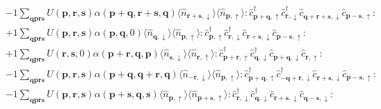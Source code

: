 \begin{align*}
	&-1 \sum_{ \mathbf{q} \mathbf{p} \mathbf{r} \mathbf{s} } U( \mathbf{p}, \mathbf{r}, \mathbf{s} )  \alpha( \mathbf{p}+\mathbf{q}, \mathbf{r}+\mathbf{s}, \mathbf{q} )   \langle \hat{n}_{ \mathbf{r}+\mathbf{s}, \downarrow } \rangle \langle \hat{n}_{ \mathbf{p}, \uparrow } \rangle :\hat{c}_{ \mathbf{p}+\mathbf{q}, \uparrow }^\dagger \hat{c}_{ \mathbf{r}, \downarrow }^\dagger \hat{c}_{ \mathbf{q}+\mathbf{r}+\mathbf{s}, \downarrow }^{\phantom{\dagger}}\hat{c}_{ \mathbf{p}-\mathbf{s}, \uparrow }^{\phantom{\dagger}}: \\
	&+1 \sum_{ \mathbf{q} \mathbf{p} \mathbf{r} \mathbf{s} } U( \mathbf{p}, \mathbf{r}, \mathbf{s} )  \alpha( \mathbf{p}, \mathbf{q}, 0 )   \langle \hat{n}_{ \mathbf{q}, \downarrow } \rangle \langle \hat{n}_{ \mathbf{p}, \uparrow } \rangle :\hat{c}_{ \mathbf{p}, \uparrow }^\dagger \hat{c}_{ \mathbf{r}, \downarrow }^\dagger \hat{c}_{ \mathbf{r}+\mathbf{s}, \downarrow }^{\phantom{\dagger}}\hat{c}_{ \mathbf{p}-\mathbf{s}, \uparrow }^{\phantom{\dagger}}: \\
	&+1 \sum_{ \mathbf{q} \mathbf{p} \mathbf{r} \mathbf{s} } U( \mathbf{r}, \mathbf{s}, 0 )  \alpha( \mathbf{p}+\mathbf{r}, \mathbf{q}, \mathbf{p} )   \langle \hat{n}_{ \mathbf{s}, \downarrow } \rangle \langle \hat{n}_{ \mathbf{r}, \uparrow } \rangle :\hat{c}_{ \mathbf{p}+\mathbf{r}, \uparrow }^\dagger \hat{c}_{ \mathbf{q}, \downarrow }^\dagger \hat{c}_{ \mathbf{p}+\mathbf{q}, \downarrow }^{\phantom{\dagger}}\hat{c}_{ \mathbf{r}, \uparrow }^{\phantom{\dagger}}: \\
	&-1 \sum_{ \mathbf{q} \mathbf{p} \mathbf{r} \mathbf{s} } U( \mathbf{p}, \mathbf{r}, \mathbf{s} )  \alpha( \mathbf{p}+\mathbf{q}, \mathbf{q}+\mathbf{r}, \mathbf{q} )   \langle \hat{n}_{ -\mathbf{r}, \downarrow } \rangle \langle \hat{n}_{ \mathbf{p}, \uparrow } \rangle :\hat{c}_{ \mathbf{p}+\mathbf{q}, \uparrow }^\dagger \hat{c}_{ -\mathbf{q}+\mathbf{r}, \downarrow }^\dagger \hat{c}_{ \mathbf{r}+\mathbf{s}, \downarrow }^{\phantom{\dagger}}\hat{c}_{ \mathbf{p}-\mathbf{s}, \uparrow }^{\phantom{\dagger}}: \\
	&-1 \sum_{ \mathbf{q} \mathbf{p} \mathbf{r} \mathbf{s} } U( \mathbf{p}, \mathbf{r}, \mathbf{s} )  \alpha( \mathbf{p}+\mathbf{s}, \mathbf{q}, \mathbf{s} )   \langle \hat{n}_{ \mathbf{p}, \uparrow } \rangle \langle \hat{n}_{ \mathbf{p}+\mathbf{s}, \uparrow } \rangle :\hat{c}_{ \mathbf{r}, \downarrow }^\dagger \hat{c}_{ \mathbf{q}, \downarrow }^\dagger \hat{c}_{ \mathbf{r}+\mathbf{s}, \downarrow }^{\phantom{\dagger}}\hat{c}_{ \mathbf{q}-\mathbf{s}, \downarrow }^{\phantom{\dagger}}: \\

\end{align*}

